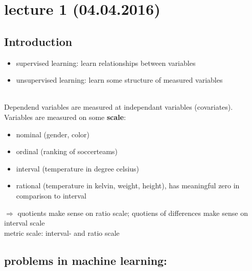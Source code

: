 \section*{lecture 1 (04.04.2016)}
\subsection*{Introduction}

	\begin{itemize}
	 \item supervised learning: learn relationships between variables
	 \item unsupervised learning: learn some structure of measured variables
	\end{itemize}
	
	\\
	Dependend variables are measured at independant variables (covariates). Variables are measured on some \textbf{scale}:
	\\
	
	\begin{itemize}
	 \item nominal (gender, color)
	 \item ordinal (ranking of soccerteams)
	 \item interval (temperature in degree celsius)
	 \item rational (temperature in kelvin, weight, height), has meaningful zero in comparison to interval
	\end{itemize}
	
	$\Rightarrow$ quotients make sense on ratio scale; quotiens of differences make sense on interval scale\\
	
	metric scale: interval- and ratio scale  \\

\subsection*{problems in machine learning:}

